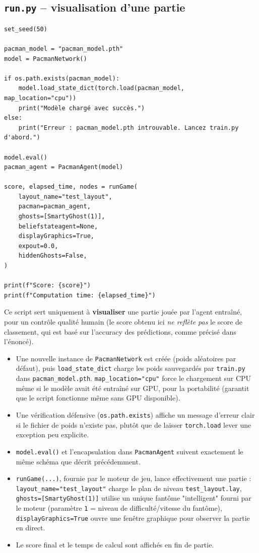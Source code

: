 \documentclass[a4paper,12pt]{article}
\begin{document}
\subsection{\texttt{run.py} -- visualisation d'une partie}

\begin{lstlisting}
set_seed(50)

pacman_model = "pacman_model.pth"
model = PacmanNetwork()

if os.path.exists(pacman_model):
    model.load_state_dict(torch.load(pacman_model, map_location="cpu"))
    print("Modèle chargé avec succès.")
else:
    print("Erreur : pacman_model.pth introuvable. Lancez train.py d'abord.")

model.eval()
pacman_agent = PacmanAgent(model)

score, elapsed_time, nodes = runGame(
    layout_name="test_layout",
    pacman=pacman_agent,
    ghosts=[SmartyGhost(1)],
    beliefstateagent=None,
    displayGraphics=True,
    expout=0.0,
    hiddenGhosts=False,
)

print(f"Score: {score}")
print(f"Computation time: {elapsed_time}")
\end{lstlisting}

Ce script sert uniquement à \textbf{visualiser} une partie jouée par
l'agent entraîné, pour un contrôle qualité humain (le score obtenu ici
\emph{ne reflète pas} le score de classement, qui est basé sur
l'accuracy des prédictions, comme précisé dans l'énoncé).

\begin{itemize}
    \item Une nouvelle instance de \texttt{PacmanNetwork} est créée
    (poids aléatoires par défaut), puis \texttt{load\_state\_dict}
    charge les poids sauvegardés par \texttt{train.py} dans
    \texttt{pacman\_model.pth}. \texttt{map\_location="cpu"} force le
    chargement sur CPU même si le modèle avait été entraîné sur GPU,
    pour la portabilité (garantit que le script fonctionne même sans
    GPU disponible).
    \item Une vérification défensive (\texttt{os.path.exists}) affiche un
    message d'erreur clair si le fichier de poids n'existe pas, plutôt
    que de laisser \texttt{torch.load} lever une exception peu explicite.
    \item \texttt{model.eval()} et l'encapsulation dans
    \texttt{PacmanAgent} suivent exactement le même schéma que décrit
    précédemment.
    \item \texttt{runGame(...)}, fournie par le moteur de jeu, lance
    effectivement une partie : \texttt{layout\_name="test\_layout"}
    charge le plan de niveau \texttt{test\_layout.lay},
    \texttt{ghosts=[SmartyGhost(1)]} utilise un unique fantôme
    "intelligent" fourni par le moteur (paramètre \texttt{1} = niveau de
    difficulté/vitesse du fantôme), \texttt{displayGraphics=True} ouvre
    une fenêtre graphique pour observer la partie en direct.
    \item Le score final et le temps de calcul sont affichés en fin de
    partie.
\end{itemize}
\end{document}
